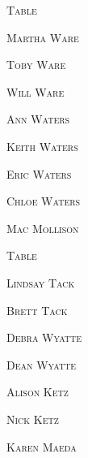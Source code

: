 \documentclass[12pt]{article}
\begin{document}
\textsc{\Huge Table}
\vspace*{.3in}


\vspace*{\fill}

\textsc{\Huge Martha Ware}

\vspace*{.15in}
\textsc{\Huge Toby Ware}

\vspace*{.15in}
\textsc{\Huge Will Ware}

\vspace*{.15in}
\textsc{\Huge Ann Waters}

\vspace*{.15in}
\textsc{\Huge Keith Waters}

\vspace*{.15in}
\textsc{\Huge Eric Waters}

\vspace*{.15in}
\textsc{\Huge Chloe Waters}

\vspace*{.15in}
\textsc{\Huge Mac Mollison}

\vspace*{\fill}

\newpage

\vspace*{.25in}

\textsc{\Huge Table}
\vspace*{.3in}


\vspace*{\fill}

\textsc{\Huge Lindsay Tack}

\vspace*{.15in}
\textsc{\Huge Brett Tack}

\vspace*{.15in}
\textsc{\Huge Debra Wyatte}

\vspace*{.15in}
\textsc{\Huge Dean Wyatte}

\vspace*{.15in}
\textsc{\Huge Alison Ketz}

\vspace*{.15in}
\textsc{\Huge Nick Ketz}

\vspace*{.15in}
\textsc{\Huge Karen Maeda}
\end{document}
